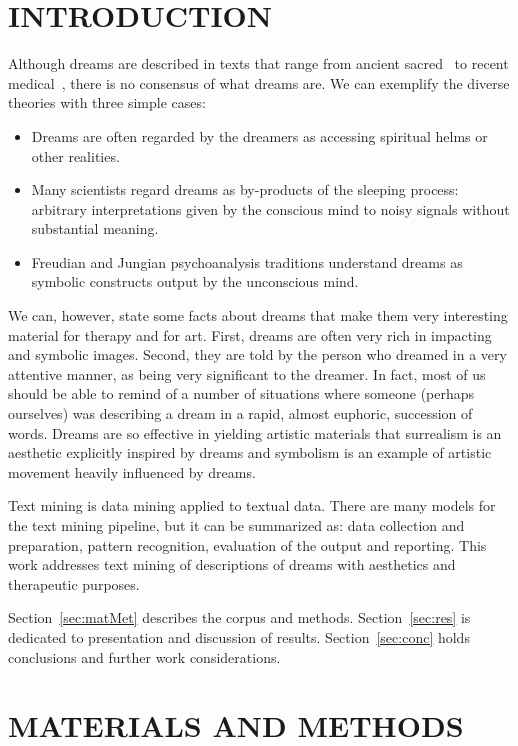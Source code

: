 \documentclass[12pt,fleqn]{article}
\begin{document}
\section{INTRODUCTION}
Although dreams are described in texts that range from ancient sacred~\cite{bible}
to recent medical~\cite{dreamMed}, there is no consensus of what dreams are.
We can exemplify the diverse theories with three simple cases:
\begin{itemize}
	\item Dreams are often regarded by the dreamers as accessing spiritual helms or other realities.
	\item Many scientists regard dreams as by-products of the sleeping process:
		arbitrary interpretations given by the conscious mind to noisy signals without substantial meaning.
	\item Freudian and Jungian psychoanalysis traditions understand dreams as symbolic constructs output by the unconscious mind.
\end{itemize}
\noindent We can, however, state some facts about dreams that make them very interesting material for therapy and for art.
First, dreams are often very rich in impacting and symbolic images.
Second, they are told by the person who dreamed in a very attentive manner, as being very significant to the dreamer.
In fact, most of us should be able to remind of a number of situations where someone (perhaps ourselves)
was describing a dream in a rapid, almost euphoric, succession of words.
Dreams are so effective in yielding artistic materials that surrealism is an aesthetic explicitly inspired by dreams and
symbolism is an example of artistic movement heavily influenced by dreams.

Text mining is data mining applied to textual data.
There are many models for the text mining pipeline, but
it can be summarized as: data collection and preparation,
pattern recognition, evaluation of the output and reporting.
This work addresses text mining of descriptions of dreams
with aesthetics and therapeutic purposes.

Section~\ref{sec:matMet} describes the corpus and methods.
Section~\ref{sec:res} is dedicated to presentation and discussion of results.
Section~\ref{sec:conc} holds conclusions and further work considerations.

\section{MATERIALS AND METHODS}
\end{document}
